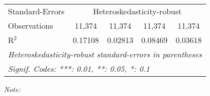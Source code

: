 \begin{table}[htbp!]
\begin{adjustbox}{width = 1\textwidth, max height = 0.95\textheight, center}
\begin{threeparttable}[b]
\begin{tabular}{lcccc}
            \midrule 
            Standard-Errors & \multicolumn{4}{c}{Heteroskedasticity-robust} \\ 
            Observations         & 11,374                         & 11,374                         & 11,374                         & 11,374\\  
            R$^2$                & 0.17108                        & 0.02813                        & 0.08469                        & 0.03618\\  
            \midrule \midrule
            \multicolumn{5}{l}{\emph{Heteroskedasticity-robust standard-errors in parentheses}}\\
            \multicolumn{5}{l}{\emph{Signif. Codes: ***: 0.01, **: 0.05, *: 0.1}}\\
         \end{tabular}
         
         \begin{tablenotes}\item \medskip \textit{Note:}
         \end{tablenotes}
      \end{threeparttable}
   \end{adjustbox}
\end{table}


